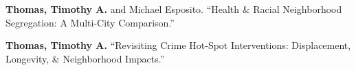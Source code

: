 \begin{cvparagraph}

\textbf{Thomas, Timothy A.} and Michael Esposito. “Health \& Racial Neighborhood Segregation: A Multi-City Comparison.”
\end{cvparagraph}

\begin{cvparagraph}

\textbf{Thomas, Timothy A.} “Revisiting Crime Hot-Spot Interventions: Displacement, Longevity, \& Neighborhood Impacts.”
\end{cvparagraph}